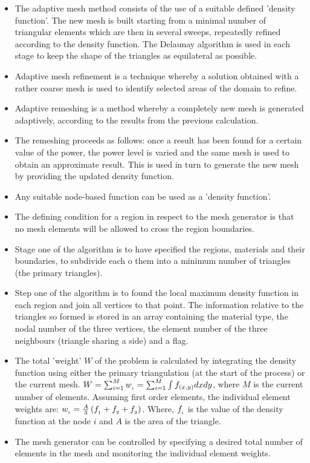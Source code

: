         \begin{itemize}
            \item The adaptive mesh method consists of the use of a suitable defined 'density function'. The new mesh is built starting from a minimal number of triangular elements which are then in several sweeps, repeatedly refined according to the density function. The Delaunay algorithm is used in each stage to keep the shape of the triangles as equilateral as possible.
            \item Adaptive mesh refinement is a technique whereby a solution obtained with a rather coarse mesh is used to identify selected areas of the domain to refine. 
            \item Adaptive remeshing is a method whereby a completely new mesh is generated adaptively, according to the results from the previous calculation.  
            \item The remeshing proceeds as follows: once a result has been found for a certain value of the power, the power level is varied and the same mesh is used to obtain an approximate result. This is used in turn to generate the new mesh by providing the updated density function. 
            \item Any suitable node-based function can be used as a 'density function'. 
            \item The defining condition for a region in respect to the mesh generator is that no mesh elements will be allowed to cross the region boundaries. 
            \item Stage one of the algorithm is to have specified the regions, materials and their boundaries, to subdivide each o them into a minimum number of triangles (the primary triangles).
            \item Step one of the algorithm is to found the local maximum density function in each region and join all vertices to that point. The information relative to the triangles so formed is stored in an array containing the material type, the nodal number of the three vertices, the element number of the three neighbours (triangle sharing a side) and a flag.  
            \item The total 'weight' $W$ of the problem is calculated by integrating the density function using either the primary triangulation (at the start of the process) or the current mesh. $W = \sum^M_{i=1} w_{_{i}} = \sum^M_{i=1}\int f_{\left(x,y\right)}dxdy $, where $M$ is the current number of elements. Assuming first order elements, the individual element weights are: $w_{_{i}} = \frac{A}{3}\left(f_{_{1}} + f_{_{2}} + f_{_{3}}\right)$. Where, $f_{_{i}}$ is the value of the density function at the node $i$ and $A$ is the area of the triangle. 
            \item The mesh generator can be controlled by specifying a desired total number of elements in the mesh and monitoring the individual element weights. 
        \end{itemize}

